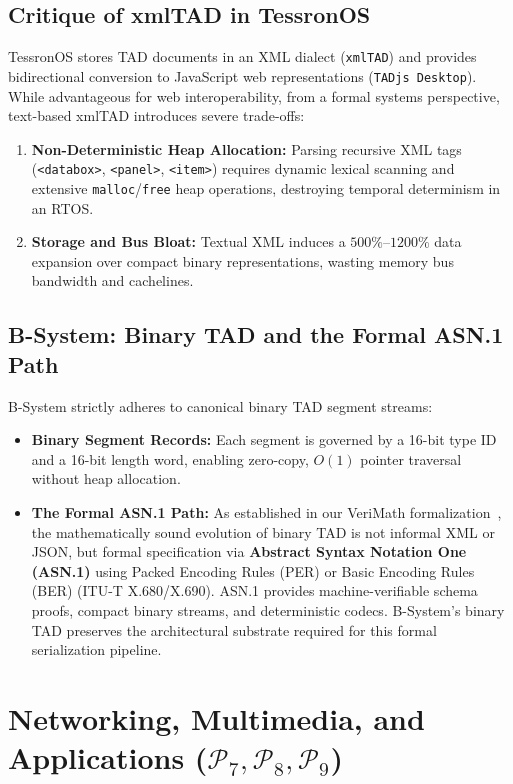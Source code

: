 \documentclass[10pt,journal,compsoc,twocolumn]{article}
\begin{document}
\subsection{Critique of xmlTAD in TessronOS}
TessronOS stores TAD documents in an XML dialect (\texttt{xmlTAD}) and provides bidirectional conversion to JavaScript web representations (\texttt{TADjs Desktop}). While advantageous for web interoperability, from a formal systems perspective, text-based xmlTAD introduces severe trade-offs:
\begin{enumerate}[leftmargin=*]
    \item \textbf{Non-Deterministic Heap Allocation:} Parsing recursive XML tags (\texttt{<databox>}, \texttt{<panel>}, \texttt{<item>}) requires dynamic lexical scanning and extensive \texttt{malloc}/\texttt{free} heap operations, destroying temporal determinism in an RTOS.
    \item \textbf{Storage and Bus Bloat:} Textual XML induces a $500\%\text{--}1200\%$ data expansion over compact binary representations, wasting memory bus bandwidth and cachelines.
\end{enumerate}

\subsection{B-System: Binary TAD and the Formal ASN.1 Path}
B-System strictly adheres to canonical binary TAD segment streams:
\begin{itemize}[leftmargin=*]
    \item \textbf{Binary Segment Records:} Each segment is governed by a 16-bit type ID and a 16-bit length word, enabling zero-copy, $O(1)$ pointer traversal without heap allocation.
    \item \textbf{The Formal ASN.1 Path:} As established in our VeriMath formalization~\cite{sokhatsky2026verimath}, the mathematically sound evolution of binary TAD is not informal XML or JSON, but formal specification via \textbf{Abstract Syntax Notation One (ASN.1)} using Packed Encoding Rules (PER) or Basic Encoding Rules (BER) (ITU-T X.680/X.690). ASN.1 provides machine-verifiable schema proofs, compact binary streams, and deterministic codecs. B-System's binary TAD preserves the architectural substrate required for this formal serialization pipeline.
\end{itemize}

\section{Networking, Multimedia, and Applications ($\mathcal{P}_7, \mathcal{P}_8, \mathcal{P}_9$)}
\label{sec:apps}
\end{document}
